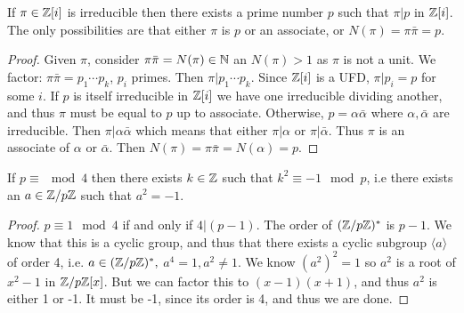 \documentclass{../mathnotes}
\begin{document}
\begin{lem}
    If $\pi\in\mathbb{Z}[i]$ is irreducible then there exists a prime number $p$ such that $\pi|p$ in $\mathbb{Z}[i]$.
    The only possibilities are that either $\pi$ is $p$ or an associate, or $N(\pi)=\pi\bar\pi=p$.
\end{lem}
\begin{proof}
    Given $\pi$, consider $\pi\bar\pi=N(\pi)\in\mathbb{N}$ an $N(\pi)>1$ as $\pi$ is not a unit.
    We factor: $\pi\bar\pi=p_1\cdots p_k$, $p_i$ primes. Then $\pi|p_1\cdots p_k$. Since $\mathbb{Z}[i]$ is a UFD, $\pi|p_i=p$ for some $i$.
    If $p$ is itself irreducible in $\mathbb{Z}[i]$ we have one irreducible dividing another, and thus $\pi$ must be equal to $p$ up to associate.
    Otherwise, $p=\alpha\bar\alpha$ where $\alpha,\bar\alpha$ are irreducible. Then $\pi|\alpha\bar\alpha$ which means that either $\pi|\alpha$
    or $\pi|\bar\alpha$. Thus $\pi$ is an associate of $\alpha$ or $\bar\alpha$. Then $N(\pi)=\pi\bar\pi=N(\alpha)=p$.
\end{proof}

\begin{lem}
    If $p\equiv\mod 4$ then there exists $k\in\mathbb{Z}$ such that $k^2\equiv-1\mod p$, i.e there exists an $a\in\mathbb{Z}/p\mathbb{Z}$ such that
    $a^2=-1$.
\end{lem}
\begin{proof}
    $p\equiv 1\mod 4$ if and only if $4|(p-1)$. The order of $(\mathbb{Z}/p\mathbb{Z})^*$ is $p-1$. We know that this is a cyclic group, and thus
    that there exists a cyclic subgroup $\langle a\rangle$ of order 4, i.e. $a\in(\mathbb{Z}/p\mathbb{Z})^*,$ $a^4=1,a^2\neq 1$.
    We know $(a^2)^2=1$ so $a^2$ is a root of $x^2-1$ in $\mathbb{Z}/p\mathbb{Z}[x]$. But we can factor this to $(x-1)(x+1)$, and thus 
    $a^2$ is either 1 or -1. It must be -1, since its order is 4, and thus we are done.
\end{proof}
\end{document}
